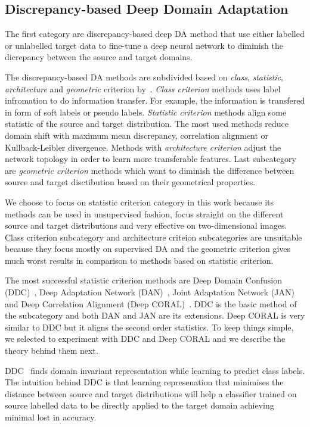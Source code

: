 \subsection{Discrepancy-based Deep Domain Adaptation}
\label{discrepancy_da}

The first category are discrepancy-based deep DA method
that use either labelled or unlabelled target data
to fine-tune a deep neural network to diminish the dicrepancy
between the source and target domains.

The discrepancy-based DA methods are subdivided based on
\textit{class}, \textit{statistic}, \textit{architecture} and \textit{geometric}
criterion by~\cite{wang2018}.
\textit{Class criterion} methods uses label infromation to do information transfer.
For example, the information is transfered in form of soft labels
or pseudo labels.
\textit{Statistic criterion} methods align some statistic of the source and target distribution.
The most used methods reduce domain shift with maximum mean discrepancy,
correlation alignment or Kullback-Leibler divergence.
Methods with \textit{architecture criterion} adjust the network topology
in order to learn more transferable features.
Last subcategory are \textit{geometric criterion} methods
which want to diminish the difference between source and target disctibution
based on their geometrical properties.

We choose to focus on statistic criterion category in this work
because its methods can be used in unsupervised fashion,
focus straight on the different source and target distributions
and very effective on two-dimensional images.
Class criterion subcategory and architecture criteion subcategories are unsuitable because they focus mostly on supervised DA
and the geometric criterion gives much worst results in comparison to methods based on statistic criterion.

The most successful statistic criterion methods are
Deep Domain Confusion (DDC)~\cite{tzeng2014},
Deep Adaptation Network (DAN)~\cite{long2015},
Joint Adaptation Network (JAN)~\cite{long2017}
and Deep Correlation Alignment (Deep CORAL)~\cite{sun2016}.
DDC is the basic method of the subcategory
and both DAN and JAN are its extensions.
Deep CORAL is very similar to DDC but it aligns the second order statistics.
To keep things simple, we selected to experiment with DDC and Deep CORAL
and we describe the theory behind them next.

DDC~\cite{tzeng2014} finds domain invariant representation
while learning to predict class labels.
The intuition behind DDC is that learning represenation
that minimises the distance between source and target distributions
will help a classifier trained on source labelled data
to be directly applied to the target domain achieving minimal lost in accuracy.

